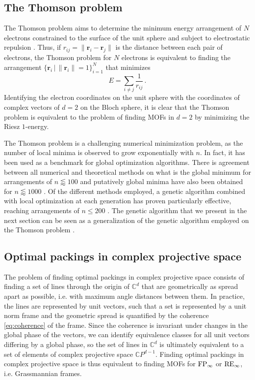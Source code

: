 \documentclass[%
superscriptaddress,
amsmath,amssymb,
 aps,
pra,
floatfix,
]{revtex4-2}
\newcommand\norm[1]{\lVert#1\rVert}
\begin{document}
\subsection{The Thomson problem}\label{subsec:thomsonproblem}

The Thomson problem aims to determine the minimum energy arrangement of $N$ electrons constrained to the surface of the unit sphere and subject to electrostatic repulsion \cite{thomson1904on, saff1997distributing}. Thus, if $r_{ij} = \norm{\boldsymbol r_i - \boldsymbol r_j}$ is the distance between each pair of electrons, the Thomson problem for $N$ electrons is equivalent to finding the arrangement $\{\boldsymbol r_i \,| \,\norm{\boldsymbol r_i} = 1 \}_{i=1}^N$ that minimizes
%
\begin{equation}\label{eq:thomson_energy}
    E = \sum_{i \neq j} \frac{1}{r_{ij}} \,.
\end{equation}
%
Identifying the electron coordinates on the unit sphere with the coordinates of complex vectors of $d=2$ on the Bloch sphere, it is clear that the Thomson problem is equivalent to the problem of finding MOFs in $d=2$ by minimizing the Riesz $1$-energy.

The Thomson problem is a challenging numerical minimization problem, as the number of local minima is observed to grow exponentially with $n$. In fact, it has been used as a benchmark for global optimization algorithms. There is agreement between all numerical and theoretical methods on what is the global minimum for arrangements of $n \lessapprox 100$ and putatively global minima have also been obtained for $n \lessapprox 1000$  \cite{altschuler2004new, wales2006structure}. Of the different methods employed, a genetic algorithm combined with local optimization at each generation has proven particularly effective, reaching arrangements of $n \leq 200$ \cite{morris1996geneticalgorithm}. The genetic algorithm that we present in the next section can be seen as a generalization of the genetic algorithm employed on the Thomson problem \cite{erber1995comment}.


\subsection{Optimal packings in complex projective space}\label{subsec:optimalpacking}
\label{optimalpackings}

The problem of finding optimal packings in complex projective space consists of finding a set of lines through the origin of $\mathbb C^d$ that are geometrically as spread apart as possible, i.e. with maximum angle distances between them. In practice, the lines are represented by unit vectors, such that a set is represented by a unit norm frame and the geometric spread is quantified by the coherence \eqref{eq:coherence} of the frame.
Since the coherence is invariant under changes in the global phase of the vectors, we can identify equivalence classes for all unit vectors differing by a global phase, so the set of lines in $\mathbb C^d$ is ultimately equivalent to a set of elements of complex projective space $\mathbb CP^{d-1}$. Finding optimal packings in complex projective space is thus equivalent to finding MOFs for ${\rm FP}_\infty$ or ${\rm RE}_\infty$, i.e. Grassmannian frames. 
\end{document}
